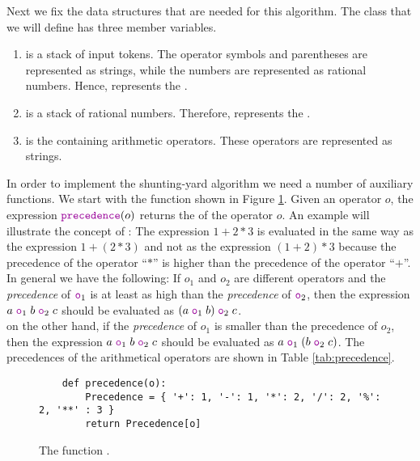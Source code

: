 Next we fix the data structures that are needed for this algorithm.  The class that we will define has three
member variables.
\begin{enumerate}
\item {} is a stack of input tokens.  The operator symbols and parentheses are
      represented as strings, while the numbers are represented as rational numbers.  Hence, 
      represents the .
\item {} is a stack of rational numbers.  Therefore,  represents the
      .
\item {} is the  containing arithmetic operators.  These operators
      are represented as strings.
\end{enumerate}
In order to implement the shunting-yard algorithm we need a number of auxiliary functions.
We start with the function  shown in Figure \ref{fig:precedence}.
Given an operator $o$, the expression $\mytt{precedence}(o)$ returns the  of the operator
$o$.  An example will illustrate the concept of :  The expression $1 + 2 * 3$
is evaluated in the same way as the expression $1 + (2*3)$ and not as the expression $(1+2)*3$ because the
precedence of the operator ``$*$'' is higher than the precedence of the operator ``$+$''.
In general we have the following:
If $o_1$ and $o_2$ are different operators and the \emph{precedence} of $\mytt{o}_1$ is at least as high than the 
\emph{precedence} of $\mytt{o}_2$, then the expression
\\[0.2cm]
\hspace*{1.3cm}
$a \;\mytt{o}_1\; b \;\mytt{o}_2\; c$ \quad should be evaluated as \quad
$(a \;\mytt{o}_1\; b) \;\mytt{o}_2\; c$.
\\[0.2cm]
on the other hand, if the \emph{precedence} of $o_1$ is smaller than the precedence of $o_2$, then the
expression $a \;\mytt{o}_1\; b \;\mytt{o}_2\; c$ should be evaluated as  $a \;\mytt{o}_1\; (b
\;\mytt{o}_2\; c)$.  
The precedences of the arithmetical operators are shown in Table \ref{tab:precedence}.

\begin{figure}[!ht]
\centering
\begin{verbatim}
    def precedence(o):
        Precedence = { '+': 1, '-': 1, '*': 2, '/': 2, '%': 2, '**' : 3 }
        return Precedence[o]
\end{verbatim}
\vspace*{-0.3cm}
\caption{The function .}
\label{fig:precedence}
\end{figure}


